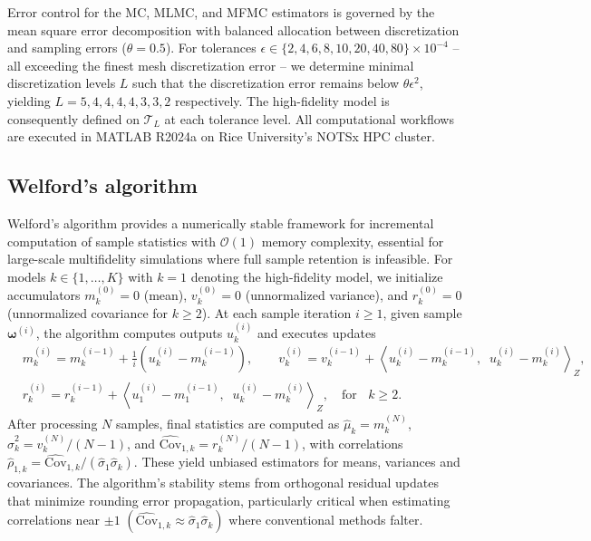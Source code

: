 Error control for the MC, MLMC, and MFMC estimators is governed by the mean square error decomposition with balanced allocation between discretization and sampling errors ($\theta = 0.5$). For tolerances $\epsilon \in \{2,4,6,8,10,20,40,80\} \times 10^{-4}$ -- all exceeding the finest mesh discretization error -- we determine minimal discretization levels $L$ such that the discretization error remains below $\theta \epsilon^2$, yielding $L = 5,4,4,4,4,3,3,2 $ respectively. The high-fidelity model is consequently defined on $\mathcal{T}_L$ at each tolerance level. All computational workflows are executed in MATLAB R2024a on Rice University's NOTSx HPC cluster.






\subsection{Welford's algorithm}
Welford's algorithm \cite{Welford:1962} provides a numerically stable framework for incremental computation of sample statistics with $\mathcal{O}(1)$ memory complexity, essential for large-scale multifidelity simulations where full sample retention is infeasible. For models $k \in \{1, \dots, K\}$ with $k=1$ denoting the high-fidelity model, we initialize accumulators $m_k^{(0)} = 0$ (mean), $v_k^{(0)} = 0$ (unnormalized variance), and $r_k^{(0)} = 0$ (unnormalized covariance for $k \geq 2$). At each sample iteration $i \geq 1$, given sample $\boldsymbol{\omega}^{(i)}$, the algorithm computes outputs $u_k^{(i)}$ and executes updates
%
\begin{align*}
    &m_k^{(i)} = m_k^{(i-1)} + \frac{1}{i}\left( u_{k}^{(i)}-m_k^{(i-1)}\right),\qquad v_k^{(i)} = v_k^{(i-1)} + \left\langle  u_{k}^{(i)}-m_k^{(i-1)}, \;\; u_{k}^{(i)}-m_k^{(i)}\right\rangle_Z,\\
    &r_k^{(i)} = r_k^{(i-1)} + \left \langle  u_{1}^{(i)}-m_{1}^{(i-1)},\;\; u_{k}^{(i)}- m_{k}^{(i)}\right\rangle_Z, \quad \text{for }\;\; k\ge 2.
\end{align*}
%
After processing $N$ samples, final statistics are computed as $\widehat{\mu}_k = m_k^{(N)}$, $\widehat{\sigma}_k^2 = v_k^{(N)}/(N-1)$, and $\widehat{\text{Cov}}_{1,k} = r_k^{(N)}/(N-1)$, with correlations $\widehat{\rho}_{1,k} = \widehat{\text{Cov}}_{1,k}/(\widehat{\sigma}_1 \widehat{\sigma}_k)$. These yield unbiased estimators for means, variances and covariances. The algorithm's stability stems from orthogonal residual updates that minimize rounding error propagation, particularly critical when estimating correlations near $\pm 1$ $(\widehat{\text{Cov}}_{1,k}\approx \widehat\sigma_1\widehat\sigma_k)$ where conventional methods falter.

